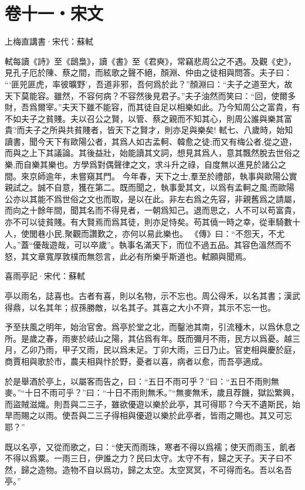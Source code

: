 \documentclass[12pt,a4paper]{ctexbook}
\begin{document}
\section{卷十一・宋文}
上梅直講書·宋代：蘇軾 \par
軾每讀《詩》至《鴟梟》，讀《書》至《君奭》，常竊悲周公之不遇。及觀《史》，見孔子厄於陳、蔡之間，而絃歌之聲不絕，顏淵、仲由之徒相與問答。夫子曰： “‘匪兕匪虎，率彼曠野’，吾道非邪，吾何爲於此？”顏淵曰：“夫子之道至大，故天下莫能容。雖然，不容何病？不容然後見君子。”夫子油然而笑曰：“回，使爾多財，吾爲爾宰。”夫天下雖不能容，而其徒自足以相樂如此。乃今知周公之富貴，有不如夫子之貧賤。夫以召公之賢，以管、蔡之親而不知其心，則周公誰與樂其富貴?而夫子之所與共貧賤者，皆天下之賢才，則亦足與樂矣! 軾七、八歲時，始知讀書，聞今天下有歐陽公者，其爲人如古孟軻、韓愈之徒;而又有梅公者,從之遊，而與之上下其議論。其後益壯，始能讀其文詞，想見其爲人，意其飄然脫去世俗之樂,而自樂其樂也。方學爲對偶聲律之文，求斗升之祿，自度無以進見於諸公之間。來京師逾年，未嘗窺其門。 今年春，天下之士,羣至於禮部，執事與歐陽公實親試之。誠不自意，獲在第二。既而聞之，執事愛其文，以爲有孟軻之風;而歐陽公亦以其能不爲世俗之文也而取，是以在此。非左右爲之先容，非親舊爲之請屬，而向之十餘年間，聞其名而不得見者，一朝爲知己。退而思之，人不可以苟富貴，亦不可以徒貧賤。有大賢焉而爲其徒，則亦足恃矣。苟其僥一時之幸，從車騎數十人，使閭巷小民,聚觀而讚歎之，亦何以易此樂也。 《傳》曰：“不怨天，不尤人。”蓋“優哉遊哉，可以卒歲”。執事名滿天下，而位不過五品。其容色溫然而不怒，其文章寬厚敦樸而無怨言，此必有所樂乎斯道也。軾願與聞焉。\par
喜雨亭記·宋代：蘇軾 \par
亭以雨名，誌喜也。古者有喜，則以名物，示不忘也。周公得禾，以名其書；漢武得鼎，以名其年；叔孫勝敵，以名其子。其喜之大小不齊，其示不忘一也。\par
予至扶風之明年，始治官舍。爲亭於堂之北，而鑿池其南，引流種木，以爲休息之所。是歲之春，雨麥於岐山之陽，其佔爲有年。既而彌月不雨，民方以爲憂。越三月，乙卯乃雨，甲子又雨，民以爲未足。丁卯大雨，三日乃止。官吏相與慶於庭，商賈相與歌於市，農夫相與忭於野，憂者以喜，病者以愈，而吾亭適成。\par
於是舉酒於亭上，以屬客而告之，曰：“五日不雨可乎？”曰：“五日不雨則無麥。”“十日不雨可乎？”曰：“十日不雨則無禾。”“無麥無禾，歲且荐饑，獄訟繁興，而盜賊滋熾。則吾與二三子，雖欲優遊以樂於此亭，其可得耶？今天不遺斯民，始旱而賜之以雨。使吾與二三子得相與優遊以樂於此亭者，皆雨之賜也。其又可忘耶？”\par
既以名亭，又從而歌之，曰：“使天而雨珠，寒者不得以爲襦；使天而雨玉，飢者不得以爲粟。一雨三日，伊誰之力？民曰太守。太守不有，歸之天子。天子曰不然，歸之造物。造物不自以爲功，歸之太空。太空冥冥，不可得而名。吾以名吾亭。”\par
\end{document}
